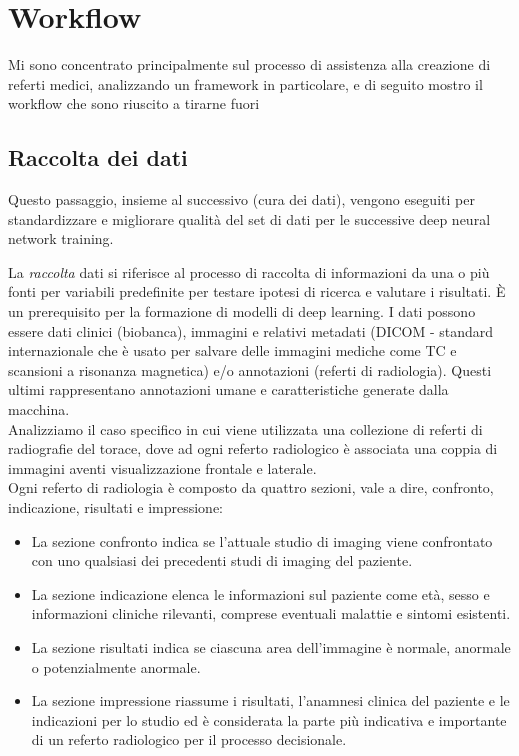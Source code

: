 \documentclass[12pt,a4paper]{report}
\begin{document}
\section{Workflow}
Mi sono concentrato principalmente sul processo di assistenza alla creazione di referti medici, analizzando un framework in particolare, e di seguito mostro il workflow che sono riuscito a tirarne fuori

\subsection{Raccolta dei dati}
Questo passaggio, insieme al successivo (cura dei dati), vengono eseguiti per standardizzare e migliorare qualità del set di dati per le successive deep neural network training.

La \emph{raccolta} dati si riferisce al processo di raccolta di informazioni da una o più fonti per variabili predefinite per testare ipotesi di ricerca e valutare i risultati. È un prerequisito per la formazione di modelli di deep learning. 
I dati possono essere dati clinici (biobanca), immagini e relativi metadati (DICOM - standard internazionale che è usato per salvare delle immagini mediche come TC e scansioni a risonanza magnetica) e/o annotazioni (referti di radiologia). Questi ultimi rappresentano annotazioni umane e caratteristiche generate dalla macchina.\\
Analizziamo il caso specifico in cui viene utilizzata una collezione di referti di radiografie del torace, dove ad ogni referto radiologico è associata una coppia di immagini aventi visualizzazione frontale e laterale.\\
Ogni referto di radiologia è composto da quattro sezioni, vale a dire, confronto, indicazione, risultati e impressione:
\begin{itemize}
    \item La sezione confronto indica se l'attuale studio di imaging viene confrontato con uno qualsiasi dei precedenti studi di imaging del paziente.
    \item La sezione indicazione elenca le informazioni sul paziente come età, sesso e informazioni cliniche rilevanti, comprese eventuali malattie e sintomi esistenti.
    \item La sezione risultati indica se ciascuna area dell'immagine è normale, anormale o potenzialmente anormale.
    \item La sezione impressione riassume i risultati, l'anamnesi clinica del paziente e le indicazioni per lo studio ed è considerata la parte più indicativa e importante di un referto radiologico per il processo decisionale.
\end{itemize}
\end{document}
